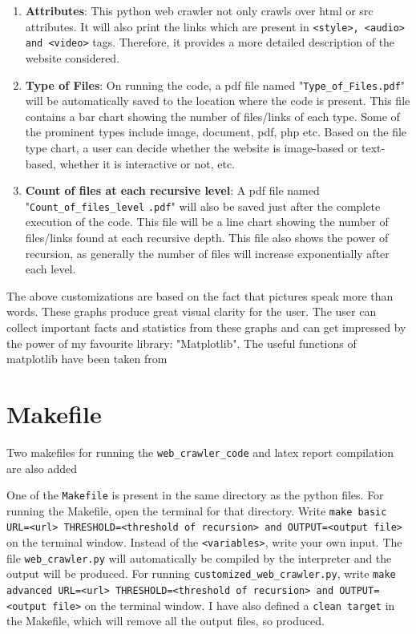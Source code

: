 \documentclass{report}
\begin{document}
\begin{enumerate}
    \item \textbf{Attributes}: This python web crawler not only crawls over html or src attributes. It will also print the links which are present in \texttt{<style>, <audio> and <video>} tags. Therefore, it provides a more detailed description of the website considered.
    \item \textbf{Type of Files}: On running the code, a pdf file named "\texttt{Type\_of\_Files.pdf}" will be automatically saved to the location where the code is present. This file contains a bar chart showing the number of files/links of each type. Some of the prominent types include image, document, pdf, php etc. Based on the file type chart, a user can decide whether the website is image-based or text-based, whether it is interactive or not, etc. 
    \item \textbf{Count of files at each recursive level}: A pdf file named "\texttt{Count\_of\_files\_level} \texttt{.pdf}" will also be saved just after the complete execution of the code. This file will be a line chart showing the number of files/links found at each recursive depth. This file also shows the power of recursion, as generally the number of files will increase exponentially after each level.
\end{enumerate}


The above customizations are based on the fact that pictures speak more than words. These graphs produce great visual clarity for the user. The user can collect important facts and statistics from these graphs and can get impressed by the power of my favourite library: "Matplotlib". The useful functions of matplotlib have been taken from \cite{Lecture_Slides}

\section{Makefile}
Two makefiles for running the \texttt{web\_crawler\_code} and latex report compilation are also added

One of the \texttt{Makefile} is present in the same directory as the python files. For running the Makefile, open the terminal for that directory.
Write \texttt{make basic URL=<url> THRESHOLD=<threshold of recursion> and OUTPUT=<output file>} on the terminal window. Instead of the \texttt{<variables>}, write your own input. The file \texttt{web\_crawler.py} will automatically be compiled by the interpreter and the output will be produced.
For running \texttt{customized\_web\_crawler.py}, write \texttt{make advanced URL=<url> THRESHOLD=<threshold of recursion> and OUTPUT=<output file>} on the terminal window. 
I have also defined a \texttt{clean target} in the Makefile, which will remove all the output files, so produced.
\end{document}
